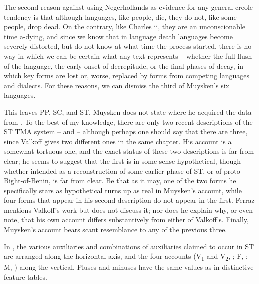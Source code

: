 
The second reason against using Negerhollands as evidence for any general creole tendency is that although languages, like people, die, they do not, like some people, drop dead. On the contrary, like Charles {\sc ii}, they are an unconscionable time a-dying, and since we know that in language death languages become severely distorted, but do not know at what time the process started, there is no way in which we can be certain what any text represents -- whether the full flush of the language, the early onset of decrepitude, or the final phases of decay, in which key forms are lost or, worse, replaced by forms from competing languages and dialects. For these reasons, we can dismiss the third of Muysken's six languages.

This leaves PP, SC, and ST. Muysken does not state where he acquired the data from . To the best of my knowledge, there are only two recent descriptions of the ST TMA system -- \citealt{Valkoff1966} and \citealt{Ferraz1979} -- although perhaps one should say that there are three, since Valkoff gives two different ones in the same chapter. His account is a somewhat tortuous one, and the exact status of these two descriptions is far from clear; he seems to suggest that the first is in some sense hypothetical, though whether intended as a reconstruc\-tion of some earlier phase of ST, or of proto-Bight-of-Benin, is far from clear. Be that as it may, one of the two forms he specifically stars as hypothetical turns up as real in Muysken's account, while four forms that appear in his second description do not appear in the first. Ferraz mentions Valkoff's work but does not discuss it; nor does he explain why, or even note, that his own account differs substantively from either of Valkoff's. Finally, Muysken's account bears scant resemblance to any of the previous three.

In %
, the various auxiliaries and combinations of auxiliaries claimed to occur in ST are arranged along the horizontal axis, and the four accounts (V\textsubscript{1} and V\textsubscript{2}, \citealt{Valkoff1966}; F, \citealt{Ferraz1979}; M, \citealt{Muysken1981a}) along the vertical. Pluses and minuses have the same values as in distinctive feature tables.


